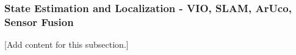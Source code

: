
\subsubsection{State Estimation and Localization - VIO, SLAM, ArUco, Sensor Fusion}
\label{subsubsec:design_7_2_state_estimation_localization}

[Add content for this subsection.]
